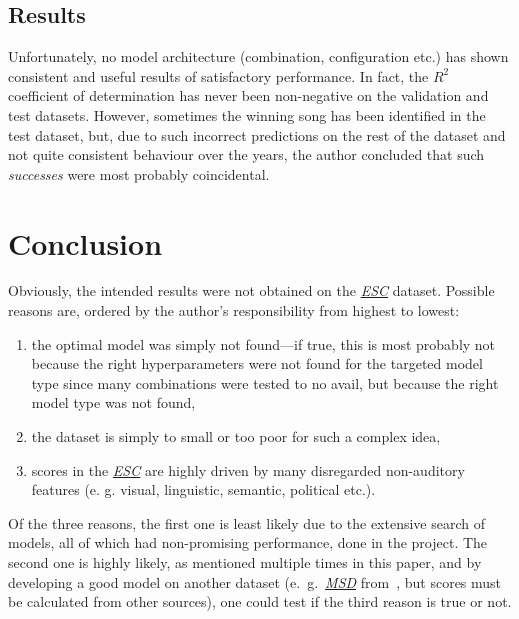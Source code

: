 \documentclass[conference, a4paper, 12pt]{IEEEtran}
\begin{document}
    \par

    \subsection{Results}
    \label{subsec:results}

    Unfortunately, no model architecture (combination, configuration etc.) has shown consistent and useful results of satisfactory performance. In fact, the $ R^{2} $ coefficient of determination has never been non-negative on the validation and test datasets. However, sometimes the winning song has been identified in the test dataset, but, due to such incorrect predictions on the rest of the dataset and not quite consistent behaviour over the years, the author concluded that such \emph{successes} were most probably coincidental.

    \par

    \section{Conclusion}
    \label{sec:conclusion}

    Obviously, the intended results were not obtained on the \href{http://eurovision.tv/}{\emph{ESC}} dataset. Possible reasons are, ordered by the author's responsibility from highest to lowest:
    \begin{enumerate}
        \item the optimal model was simply not found---if true, this is most probably not because the right hyperparameters were not found for the targeted model type since many combinations were tested to no avail, but because the right model type was not found,
        \item the dataset is simply to small or too poor for such a complex idea,
        \item scores in the \href{http://eurovision.tv/}{\emph{ESC}} are highly driven by many disregarded non-auditory features (e. g. visual, linguistic, semantic, political etc.).
    \end{enumerate}
    Of the three reasons, the first one is least likely due to the extensive search of models, all of which had non-promising performance, done in the project. The second one is highly likely, as mentioned multiple times in this paper, and by developing a good model on another dataset (e.~g.\ \href{http://millionsongdataset.com/}{\emph{MSD}} from~\cite{bib:Bertin2011}, but scores must be calculated from other sources), one could test if the third reason is true or not.
\end{document}
